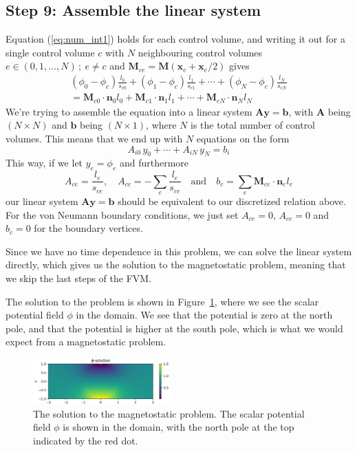 \documentclass[acmtog]{acmart}
\newcommand{\nfrac}[2]{#1/#2}
\begin{document}
\subsection*{Step 9: Assemble the linear system}
Equation (\ref{eq:num_int1}) holds for each control volume, and writing it out for a single control volume $c$ with $N$ neighbouring control volumes $e \in (0,1,\dots, N) \, ; \ e \neq c$ and $\boldsymbol M_{ce} = \boldsymbol M\left(\nfrac{\boldsymbol x_c + \boldsymbol x_e}{2}\right)$ gives
%
\begin{multline}
  (\phi_0 - \phi_c) \frac{l_0}{s_{c0}} + (\phi_1 - \phi_c) \frac{l_1}{s_{c1}} + \cdots + (\phi_N - \phi_c) \frac{l_N}{s_{cN}}\\
  = \boldsymbol M_{c0} \cdot \boldsymbol n_0 l_0 + \boldsymbol M_{c1} \cdot \boldsymbol n_1 l_1 + \cdots + \boldsymbol M_{cN} \cdot \boldsymbol n_N l_N
\end{multline}
%
We're trying to assemble the equation into a linear system $\boldsymbol A \boldsymbol y = \boldsymbol b$, with $\boldsymbol A$ being $(N \times N)$ and $\boldsymbol b$ being $(N \times 1)$, where $N$ is the total number of control volumes. This means that we end up with $N$ equations on the form
%
\begin{equation}
  A_{i0} \, y_0 + \cdots + A_{i N} \, y_N= b_i
\end{equation}
%
This way, if we let $y_e = \phi_e$ and furthermore
%
\begin{equation}
  A_{ce} = \frac{l_e}{s_{ce}}, \quad A_{cc} = - \sum_e \frac{l_e}{s_{ce}} \quad \text{and} \quad b_c = \sum_e \boldsymbol M_{ce} \cdot \boldsymbol n_e l_e
\end{equation}
%
our linear system $\boldsymbol A \boldsymbol y = \boldsymbol b$ should be equivalent to our discretized relation above. For the von Neumann boundary conditions, we just set $A_{ce} = 0$, $A_{cc} = 0$ and $b_c = 0$ for the boundary vertices.
%

Since we have no time dependence in this problem, we can solve the linear system directly, which gives us the solution to the magnetostatic problem, meaning that we skip the last steps of the FVM.\@

The solution to the problem is shown in Figure\ \ref{fig:mag_sol1}, where we see the scalar potential field $\phi$ in the domain. We see that the potential is zero at the north pole, and that the potential is higher at the south pole, which is what we would expect from a magnetostatic problem.

\begin{figure}
  \centering
  \includegraphics[width=0.47\textwidth]{Images/mag_sol1.png}
  \caption{The solution to the magnetostatic problem. The scalar potential field $\phi$ is shown in the domain, with the north pole at the top indicated by the red dot.\label{fig:mag_sol1}}
\end{figure}
\end{document}
